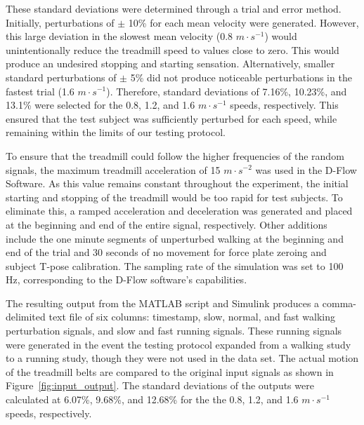 \documentclass[10pt,a4paper,twocolumn]{article}
\begin{document}
These standard deviations were determined through a trial and error method.
Initially, perturbations of $\pm$ 10\% for each mean velocity were generated.
However, this large deviation in the slowest mean velocity (0.8 $m \cdot
s^{-1}$) would unintentionally reduce the treadmill speed to values close to
zero. This would produce an undesired stopping and starting sensation.
Alternatively, smaller standard perturbations of $\pm$ 5\% did not produce
noticeable perturbations in the fastest trial (1.6 $m \cdot s^{-1}$).
Therefore, standard deviations of 7.16\%, 10.23\%, and 13.1\% were selected for
the 0.8, 1.2, and 1.6 $m \cdot s^{-1}$ speeds, respectively.  This ensured that
the test subject was sufficiently perturbed for each speed, while remaining
within the limits of our testing protocol.

To ensure that the treadmill could follow the higher frequencies of the random
signals, the maximum treadmill acceleration of 15 $m \cdot s^{-2}$ was used in
the D-Flow Software. As this value remains constant throughout the experiment,
the initial starting and stopping of the treadmill would be too rapid for test
subjects. To eliminate this, a ramped acceleration and deceleration was
generated and placed at the beginning and end of the entire signal,
respectively. Other additions include the one minute segments of unperturbed
walking at the beginning and end of the trial and 30 seconds of no movement for
force plate zeroing and subject T-pose calibration.  The sampling rate of the
simulation was set to 100 Hz, corresponding to the D-Flow software's
capabilities.

The resulting output from the MATLAB script and Simulink produces a comma-
delimited text file of six columns: timestamp, slow, normal, and fast walking
perturbation signals, and slow and fast running signals.  These running signals
were generated in the event the testing protocol expanded from a walking study
to a running study, though they were not used in the data set.  The actual
motion of the treadmill belts are compared to the original input signals as
shown in Figure~\ref{fig:input_output}.   The standard deviations of the
outputs were calculated at 6.07\%, 9.68\%, and 12.68\% for the the 0.8, 1.2,
and 1.6 $m \cdot s^{-1}$ speeds, respectively.
\end{document}
